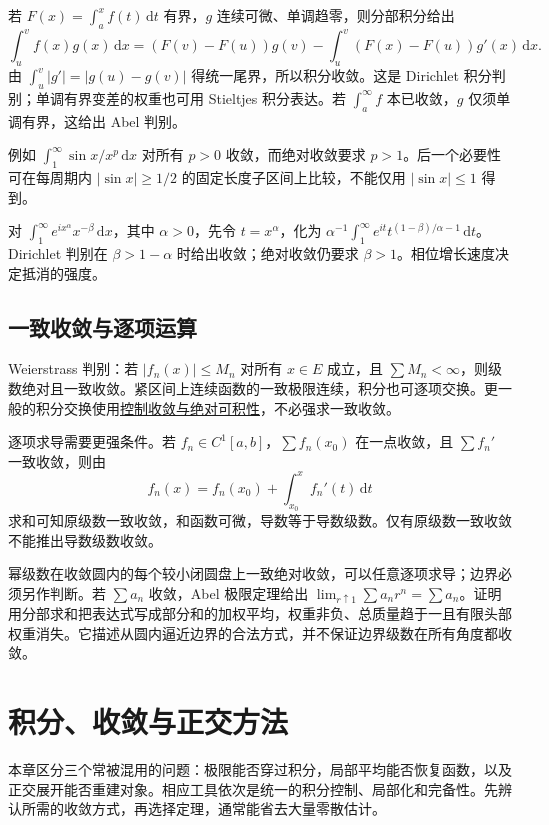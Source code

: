 \documentclass[12pt,fontset=fandol]{ctexart}
\begin{document}
若 $F(x)=\int_a^xf(t)\,\mathrm dt$ 有界，$g$ 连续可微、单调趋零，则分部积分给出
\[
\int_u^vf(x)g(x)\,\mathrm dx
=(F(v)-F(u))g(v)-\int_u^v(F(x)-F(u))g'(x)\,\mathrm dx.
\]
由 $\int_u^v|g'|=|g(u)-g(v)|$ 得统一尾界，所以积分收敛。这是 Dirichlet 积分判别；单调有界变差的权重也可用 Stieltjes 积分表达。若 $\int_a^\infty f$ 本已收敛，$g$ 仅须单调有界，这给出 Abel 判别。

例如 $\int_1^\infty\sin x/x^p\,\mathrm dx$ 对所有 $p>0$ 收敛，而绝对收敛要求 $p>1$。后一个必要性可在每周期内 $|\sin x|\geq1/2$ 的固定长度子区间上比较，不能仅用 $|\sin x|\leq1$ 得到。

对 $\int_1^\infty e^{ix^\alpha}x^{-\beta}\,\mathrm dx$，其中 $\alpha>0$，先令 $t=x^\alpha$，化为 $\alpha^{-1}\int_1^\infty e^{it}t^{(1-\beta)/\alpha-1}\,\mathrm dt$。Dirichlet 判别在 $\beta>1-\alpha$ 时给出收敛；绝对收敛仍要求 $\beta>1$。相位增长速度决定抵消的强度。

\subsection{一致收敛与逐项运算}

\label{app:series-uniform}

Weierstrass 判别：若 $|f_n(x)|\leq M_n$ 对所有 $x\in E$ 成立，且 $\sum M_n<\infty$，则级数绝对且一致收敛。紧区间上连续函数的一致极限连续，积分也可逐项交换。更一般的积分交换使用\hyperref[app:integration-exchange]{控制收敛与绝对可积性}，不必强求一致收敛。

逐项求导需要更强条件。若 $f_n\in C^1[a,b]$，$\sum f_n(x_0)$ 在一点收敛，且 $\sum f_n'$ 一致收敛，则由
\[
f_n(x)=f_n(x_0)+\int_{x_0}^xf_n'(t)\,\mathrm dt
\]
求和可知原级数一致收敛，和函数可微，导数等于导数级数。仅有原级数一致收敛不能推出导数级数收敛。

幂级数在收敛圆内的每个较小闭圆盘上一致绝对收敛，可以任意逐项求导；边界必须另作判断。若 $\sum a_n$ 收敛，Abel 极限定理给出 $\lim_{r\uparrow1}\sum a_nr^n=\sum a_n$。证明用分部求和把表达式写成部分和的加权平均，权重非负、总质量趋于一且有限头部权重消失。它描述从圆内逼近边界的合法方式，并不保证边界级数在所有角度都收敛。



\section{积分、收敛与正交方法}

\label{app:integration}

本章区分三个常被混用的问题：极限能否穿过积分，局部平均能否恢复函数，以及正交展开能否重建对象。相应工具依次是统一的积分控制、局部化和完备性。先辨认所需的收敛方式，再选择定理，通常能省去大量零散估计。
\end{document}
